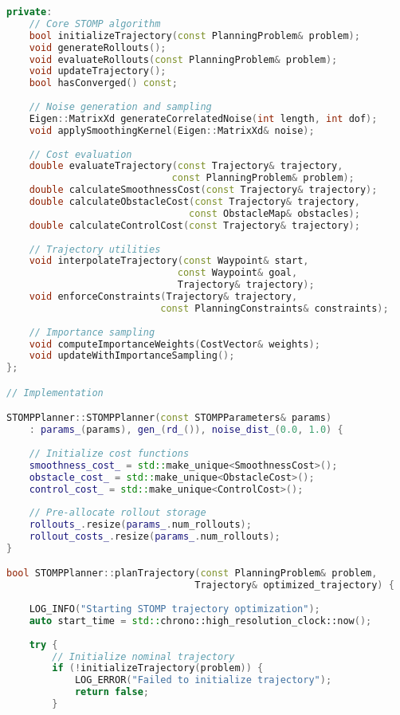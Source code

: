 \begin{lstlisting}[language=C++, caption={STOMP Path Planning Algorithm}, label={lst:app-stomp}]
private:
    // Core STOMP algorithm
    bool initializeTrajectory(const PlanningProblem& problem);
    void generateRollouts();
    void evaluateRollouts(const PlanningProblem& problem);
    void updateTrajectory();
    bool hasConverged() const;
    
    // Noise generation and sampling
    Eigen::MatrixXd generateCorrelatedNoise(int length, int dof);
    void applySmoothingKernel(Eigen::MatrixXd& noise);
    
    // Cost evaluation
    double evaluateTrajectory(const Trajectory& trajectory, 
                             const PlanningProblem& problem);
    double calculateSmoothnessCost(const Trajectory& trajectory);
    double calculateObstacleCost(const Trajectory& trajectory, 
                                const ObstacleMap& obstacles);
    double calculateControlCost(const Trajectory& trajectory);
    
    // Trajectory utilities
    void interpolateTrajectory(const Waypoint& start, 
                              const Waypoint& goal, 
                              Trajectory& trajectory);
    void enforceConstraints(Trajectory& trajectory, 
                           const PlanningConstraints& constraints);
    
    // Importance sampling
    void computeImportanceWeights(CostVector& weights);
    void updateWithImportanceSampling();
};

// Implementation

STOMPPlanner::STOMPPlanner(const STOMPParameters& params) 
    : params_(params), gen_(rd_()), noise_dist_(0.0, 1.0) {
    
    // Initialize cost functions
    smoothness_cost_ = std::make_unique<SmoothnessCost>();
    obstacle_cost_ = std::make_unique<ObstacleCost>();
    control_cost_ = std::make_unique<ControlCost>();
    
    // Pre-allocate rollout storage
    rollouts_.resize(params_.num_rollouts);
    rollout_costs_.resize(params_.num_rollouts);
}

bool STOMPPlanner::planTrajectory(const PlanningProblem& problem, 
                                 Trajectory& optimized_trajectory) {
    
    LOG_INFO("Starting STOMP trajectory optimization");
    auto start_time = std::chrono::high_resolution_clock::now();
    
    try {
        // Initialize nominal trajectory
        if (!initializeTrajectory(problem)) {
            LOG_ERROR("Failed to initialize trajectory");
            return false;
        }
        

\end{lstlisting}
